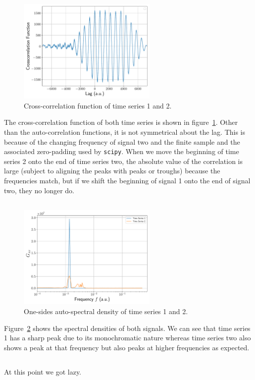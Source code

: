\documentclass[a4paper,DIV=12,english]{scrartcl}
\begin{document}
\subsection{}
\begin{figure}
    \centering
    \includegraphics[width=0.6\textwidth]{../cc.pdf}
    \caption{Cross-correlation function of time series 1 and 2.}
    \label{fig:cc}
\end{figure}
The cross-correlation function of both time series is shown in figure~\ref{fig:cc}. Other than the auto-correlation functions, it is not symmetrical about the lag. This is because of the changing frequency of signal two and the finite sample and the associated zero-padding used by \texttt{scipy}. When we move the beginning of time series 2 onto the end of time series two, the absolute value of the correlation is large (subject to aligning the peaks with peaks or troughs) because the frequencies match, but if we shift the beginning of signal 1 onto the end of signal two, they no longer do. 
\subsection{}
\begin{figure}
    \centering
    \includegraphics[width=0.6\textwidth]{../G_03.pdf}
    \caption{One-sides auto-spectral density of time series 1 and 2.}
    \label{fig:g_3}
\end{figure}
Figure~\ref{fig:g_3} shows the spectral densities of both signals. We can see that time series 1 has a sharp peak due to its monochromatic nature whereas time series two also shows a peak at that frequency but also peaks at higher frequencies as expected.
\subsection{}
At this point we got lazy.
\end{document}

